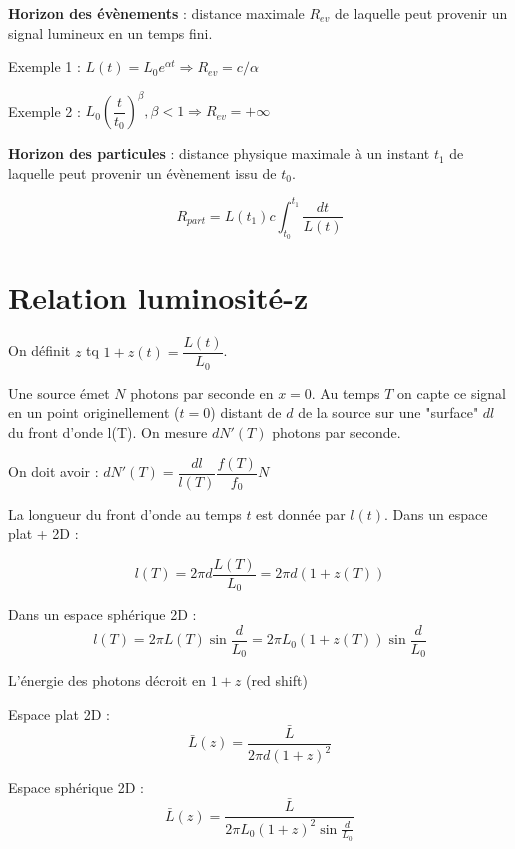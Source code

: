 \documentclass[11pt]{article} %
\newcommand{\dint}{\displaystyle \int}
\begin{document}
\textbf{Horizon des évènements} : distance maximale $R_{ev}$ de laquelle peut provenir un signal lumineux en un temps fini.

Exemple 1 : $L(t) = L_0 e^{\alpha t} \Rightarrow R_{ev} = c/\alpha$

Exemple 2 : $L_0 \left ( \dfrac{t}{t_0} \right )^\beta, \beta < 1 \Rightarrow R_{ev} = +\infty$

\textbf{Horizon des particules} : distance physique maximale à un instant $t_1$ de laquelle peut provenir un évènement issu de $t_0$.

\begin{equation}
R_{part} = L(t_1) c \dint_{t_0}^{t_1} \dfrac{dt}{L(t)}
\end{equation}

\section{Relation luminosité-z}

On définit $z$ tq $1+z(t) = \dfrac{L(t)}{L_0}$.

Une source émet $N$ photons par seconde en $x = 0$. Au temps $T$ on capte ce signal en un point originellement ($t = 0$) distant de $d$ de la source sur une "surface" $dl$ du front d'onde l(T). On mesure $dN'(T)$ photons par seconde.

On doit avoir :
$dN'(T) = \dfrac{dl}{l(T)} \dfrac{f(T)}{f_0} N$


La longueur du front d'onde au temps $t$ est donnée par $l(t)$. Dans un espace plat + 2D :

\begin{equation}
l(T) = 2\pi d \dfrac{L(T)}{L_0} = 2\pi d (1+z(T)) 
\end{equation}

Dans un espace sphérique 2D :
\begin{equation}
l(T) = 2\pi L(T) \sin \dfrac{d}{L_0} = 2\pi L_0 (1+z(T)) \sin \dfrac{d}{L_0} 
\end{equation}

L'énergie des photons décroit en $1+z$ (red shift) 

Espace plat 2D : 
\begin{equation}
\bar{L} (z) = \dfrac{\bar{L}}{2\pi d(1+z)^2}
\end{equation}

Espace sphérique 2D : 
\begin{equation}
\bar{L} (z) = \dfrac{\bar{L}}{2\pi L_0(1+z)^2 \sin\frac{d}{L_0}}
\end{equation}
\end{document}
